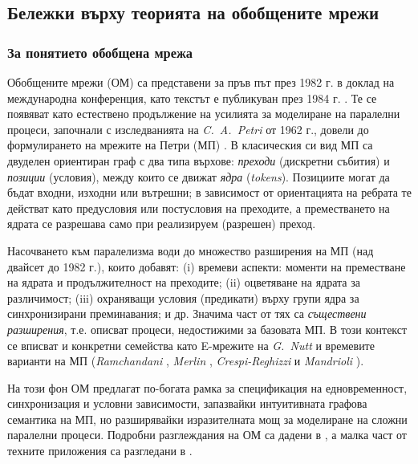 

\subsection{Бележки върху теорията на обобщените мрежи}
\subsubsection{За понятието обобщена мрежа}

\hspace*{2.5em}Обобщените мрежи (ОМ) са представени за пръв път през 1982 г. в доклад на международна конференция, като текстът е публикуван през 1984 г. \cite{XY20}. Те се появяват като естествено продължение на усилията за моделиране на паралелни процеси, започнали с изследванията на \textit{C.~A.~Petri} от 1962 г., довели до формулирането на мрежите на Петри (МП) \cite{XY1}. В класическия си вид МП са двуделен ориентиран граф с два типа върхове: \emph{преходи} (дискретни събития) и \emph{позиции} (условия), между които се движат \emph{ядра} (\textit{tokens}). Позициите могат да бъдат входни, изходни или вътрешни; в зависимост от ориентацията на ребрата те действат като предусловия или постусловия на преходите, а преместването на ядрата се разрешава само при реализируем (разрешен) преход.

Насочването към паралелизма води до множество разширения на МП (над двайсет до 1982 г.), които добавят: (i) времеви аспекти: моменти на преместване на ядрата и продължителност на преходите; (ii) оцветяване на ядрата за различимост; (iii) охраняващи условия (предикати) върху групи ядра за синхронизирани преминавания; и др. Значима част от тях са \emph{съществени разширения}, т.е. описват процеси, недостижими за базовата МП. В този контекст се вписват и конкретни семейства като E-мрежите на \textit{G.~Nutt} \cite{XY2} и времевите варианти на МП (\textit{Ramchandani} \cite{XY3}, \textit{Merlin} \cite{XY4}, \textit{Crespi-Reghizzi} и \textit{Mandrioli} \cite{XY5}).

На този фон ОМ предлагат по-богата рамка за спецификация на едновременност, синхронизация и условни зависимости, запазвайки интуитивната графова семантика на МП, но разширявайки изразителната мощ за моделиране на сложни паралелни процеси. Подробни разглеждания на ОМ са дадени в \cite{Z3,Z1,BAM, AtanassovSotirova2017}, а малка част от техните приложения са разгледани в \cite{Orozova2011,Georgiev1998,StefanovaPavlova2001,Aladjov2002,SgurevAIHistory2021, ZotevaKrawczakDMSurvey2017}.


